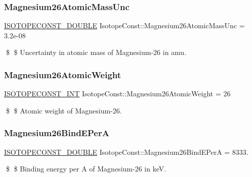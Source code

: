 \subsubsection{\texorpdfstring{Magnesium26\+Atomic\+Mass\+Unc}{Magnesium26AtomicMassUnc}}
{\footnotesize\ttfamily \mbox{\hyperlink{group___isotope_const-_macros_ga8f45a7272ce02c0b4c65c44636ed719a}{I\+S\+O\+T\+O\+P\+E\+C\+O\+N\+S\+T\+\_\+\+D\+O\+U\+B\+LE}} Isotope\+Const\+::\+Magnesium26\+Atomic\+Mass\+Unc = 3.\+2e-\/08}

\$ \$ Uncertainty in atomic mass of Magnesium-\/26 in amu. \mbox{\label{group___isotope_const-_magnesium-_mg26_gaef234e5c0b918a791f6c4e9d01f3ad5b}} 
\subsubsection{\texorpdfstring{Magnesium26\+Atomic\+Weight}{Magnesium26AtomicWeight}}
{\footnotesize\ttfamily \mbox{\hyperlink{group___isotope_const-_macros_ga5f18360b3e99483a35c32d789e62621c}{I\+S\+O\+T\+O\+P\+E\+C\+O\+N\+S\+T\+\_\+\+I\+NT}} Isotope\+Const\+::\+Magnesium26\+Atomic\+Weight = 26}

\$ \$ Atomic weight of Magnesium-\/26. \mbox{\label{group___isotope_const-_magnesium-_mg26_ga9dde77ec6e7117a64c34c2db06a5e88b}} 
\subsubsection{\texorpdfstring{Magnesium26\+Bind\+E\+PerA}{Magnesium26BindEPerA}}
{\footnotesize\ttfamily \mbox{\hyperlink{group___isotope_const-_macros_ga8f45a7272ce02c0b4c65c44636ed719a}{I\+S\+O\+T\+O\+P\+E\+C\+O\+N\+S\+T\+\_\+\+D\+O\+U\+B\+LE}} Isotope\+Const\+::\+Magnesium26\+Bind\+E\+PerA = 8333.}

\$ \$ Binding energy per A of Magnesium-\/26 in keV. \mbox{\label{group___isotope_const-_magnesium-_mg26_gab399a554656b49843f41f8ce8e6380e2}} 
